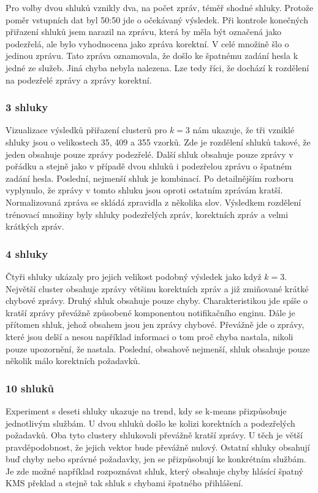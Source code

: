 \documentclass[thesis=M,czech]{FITthesis}[2012/10/20]
\begin{document}
					Pro volby dvou shluků vznikly dva, na počet zpráv, téměř shodné shluky. Protože poměr vstupních dat byl 50:50 jde o očekávaný výsledek. Při kontrole konečných přiřazení shluků jsem narazil na zprávu, která by měla být označená jako podezřelá, ale bylo vyhodnocena jako zpráva korektní. V celé množině šlo o jedinou zprávu. Tato zpráva oznamovala, že došlo ke špatnému zadání hesla k jedné ze služeb. Jiná chyba nebyla nalezena. Lze tedy říci, že dochází k rozdělení na podezřelé zprávy a zprávy korektní.
				
				\subsubsection{3 shluky}
					Vizualizace výsledků přiřazení clusterů pro $k = 3$ nám ukazuje, že tři vzniklé shluky jsou o velikostech 35, 409 a 355 vzorků. Zde je rozdělení shluků takové, že jeden obsahuje pouze zprávy podezřelé. Další shluk obsahuje pouze zprávy v pořádku a stejně jako v případě dvou shluků i podezřelou zprávu o špatném zadání hesla. Poslední, nejmenší shluk je kombinací. Po detailnějším rozboru vyplynulo, že zprávy v tomto shluku jsou oproti ostatním zprávám kratší. Normalizovaná zpráva se skládá zpravidla z několika slov. Výsledkem rozdělení trénovací množiny byly shluky podezřelých zpráv, korektních zpráv a velmi krátkých zpráv.
				
				\subsubsection{4 shluky}
				Čtyři shluky ukázaly pro jejich velikost podobný výsledek jako když $k = 3$. Největší cluster obsahuje zprávy většinu korektních zpráv a již zmiňované krátké chybové zprávy. Druhý shluk obsahuje pouze chyby. Charakteristikou jde spíše o kratší zprávy převážně způsobené komponentou notifikačního enginu. Dále je přítomen shluk, jehož obsahem jsou jen zprávy chybové. Převážně jde o zprávy, které jsou delší a nesou například informaci o tom proč chyba nastala, nikoli pouze upozornění, že nastala. Poslední, obsahově nejmenší, shluk obsahuje pouze několik málo korektních požadavků. 
				
				\subsubsection{10 shluků}
				Experiment s deseti shluky ukazuje na trend, kdy se k-means přizpůsobuje jednotlivým službám. U dvou shluků došlo ke kolizi korektních a podezřelých požadavků. Oba tyto clustery shlukovali převážně kratší zprávy. U těch je větší pravděpodobnost, že jejich vektor bude převážně nulový. Ostatní shluky obsahují buď chyby nebo správné požadavky, jen se přizpůsobují ke konkrétním službám. Je zde možné například rozpoznávat shluk, který obsahuje chyby hlásící špatný KMS překlad a stejně tak shluk s chybami špatného přihlášení.
				
\end{document}
